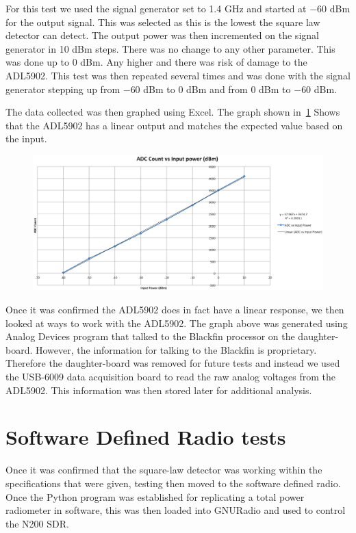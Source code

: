 For this test we used the signal generator set to 1.4 GHz and started at $-60$ dBm for the output signal.  This was selected as this is the lowest the square law detector can detect.  The output power was then incremented on the signal generator in 10 dBm steps.  There was no change to any other parameter.  This was done up to 0 dBm.  Any higher and there was risk of damage to the ADL5902.  This test was then repeated several times and was done with the signal generator stepping up from $-60$ dBm to 0 dBm and from 0 dBm to $-60$ dBm.  

The data collected was then graphed using Excel.  The graph shown in~\ref{adl5902_linear}
Shows that the ADL5902 has a linear output and matches the expected value based on the input.  

\begin{figure}[h!tb] \centering

\includegraphics[width=\textwidth]{Images/Linearsquarelaw}

\label{adl5902_linear}
\end{figure}

Once it was confirmed the ADL5902 does in fact have a linear response, we then looked at ways to work with the ADL5902.  The graph above was generated using Analog Devices program that talked to the Blackfin processor on the daughter-board.  However, the information for talking to the Blackfin is proprietary.  Therefore the daughter-board was removed for future tests and instead we used the USB-6009 data acquisition board to read the raw analog voltages from the ADL5902.  This information was then stored later for additional analysis.  

\section{Software Defined Radio tests}
Once it was confirmed that the square-law detector was working within the specifications that were given, testing then moved to the software defined radio.  Once the Python program was established for replicating a total power radiometer in software, this was then loaded into GNURadio and used to control the N200 SDR.  


